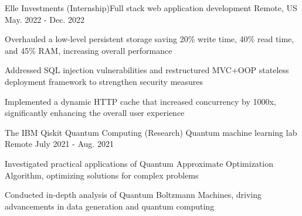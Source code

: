 \begin{cventries}
  \begin{comment}
  \cventry
    {Machine Learning \& Computation}
    {Chemical Molecular Energy Optimization}
    {Providence, RI}
    {Aug 2022 - Present}
    {
      \begin{cvitems}
        \item {Analyzed traditional Hartree-Fock and DFT methods with Gaussian}
        \item {Implemented the original data pipeline on Brown's Oscar super computing cluster with 200x speed}
        \item {Working on an efficient Belief Propagation network based on HMC}
      \end{cvitems}
    }
  \end{comment}

  \cventry
    {Elle Investments}
    {(Internship)Full stack web application development}
    {Remote, US}
    {May. 2022 - Dec. 2022}
    {
      \begin{cvitems}
          \item {Overhauled a low-level persistent storage saving 20\% write time, 40\% read time, and 45\% RAM, increasing overall performance}
          \item {Addressed SQL injection vulnerabilities and restructured MVC+OOP stateless deployment framework to strengthen security measures}
          \item {Implemented a dynamic HTTP cache that increased concurrency by 1000x, significantly enhancing the overall user experience}
      \end{cvitems}
    }

  \cventry
    {The IBM Qiskit Quantum Computing}
    {(Research) Quantum machine learning lab}
    {Remote}
    {July 2021 - Aug. 2021}
    {
      \begin{cvitems}
        \item {Investigated practical applications of Quantum Approximate Optimization Algorithm, optimizing solutions for complex problems}
        \item {Conducted in-depth analysis of Quantum Boltzmann Machines, driving advancements in data generation and quantum computing}
      \end{cvitems}
    }


\end{cventries}
